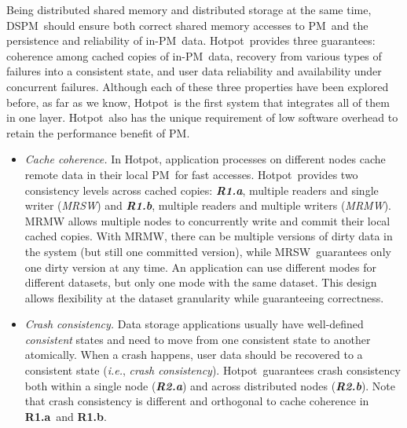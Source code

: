 \documentclass[sigconf]{acmart}
\renewcommand{\em}{\it}
\newcommand{\ie}{\textit{i.e.}}
\newcommand{\dsnvm}{DSPM}
\newcommand{\nvm}{PM}
\newcommand{\hotpot}{Hotpot}
\newcommand{\mrmw}{MRMW}
\newcommand{\mrsw}{MRSW}
\newcommand{\ra}{\textbf{R1.a}}
\newcommand{\rb}{\textbf{R1.b}}
\newcommand{\rcs}{\textbf{R2.a}}
\newcommand{\rcm}{\textbf{R2.b}}
\providecommand{\DIFaddend}{} %
\providecommand{\DIFdelbegin}{} %
\providecommand{\DIFdelend}{} %
\begin{document}
{\DIFaddend Being distributed shared memory and distributed storage at the same time,
\dsnvm\ should ensure both correct shared memory accesses to \nvm\
and the persistence and reliability of in-\nvm\ data. 
\hotpot\ provides three guarantees: coherence among cached copies of in-\nvm\ data,
recovery from various types of failures into a consistent state,
and user data reliability and availability under concurrent failures.
Although each of these three properties have been explored before,
as far as we know, \hotpot\ is the first system that integrates all of them in one layer.
\hotpot\ also has the unique requirement of low software overhead to retain the performance benefit of \nvm.

\DIFdelbegin %
\DIFdelend  \begin{itemize} [leftmargin=*]
\item{\em Cache coherence.} 
In \hotpot, application processes on different nodes cache remote data in their local \nvm\ for fast accesses.
\hotpot\ provides two consistency levels across cached copies: 
{\em \ra}, multiple readers and single writer ({\em MRSW}) 
and {\em \rb}, multiple readers and multiple writers ({\em MRMW}).
MRMW allows multiple nodes to concurrently write and commit their local cached copies.
With \mrmw, there can be multiple versions of dirty data in the system (but still one committed version),
while \mrsw\ guarantees only one dirty version at any time.
An application can use different modes for different datasets,
but only one mode with the same dataset.
This design allows flexibility at the dataset granularity while guaranteeing correctness.

\DIFdelbegin %
\DIFdelend \item{\em Crash consistency.} 
Data storage applications usually have well-defined {\em consistent} states and need to move from 
one consistent state to another atomically.
When a crash happens, 
user data should be recovered to a consistent state ({\ie, \em crash consistency}). 
\hotpot\ guarantees crash consistency both within a single node ({\em \rcs}) and across distributed nodes ({\em \rcm}).
Note that crash consistency is different and orthogonal to cache
coherence in \ra\ and \rb. 


\end{itemize}}
\end{document}
